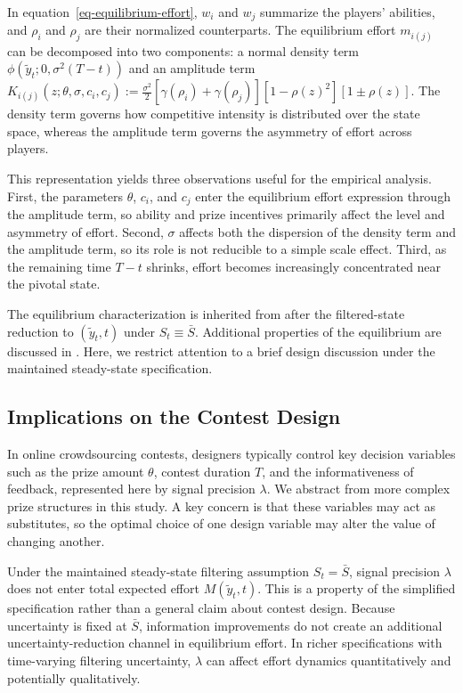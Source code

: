 \documentclass[mnsc]{informs3}
\begin{document}
In equation~\eqref{eq-equilibrium-effort}, $w_i$ and $w_j$ summarize the players' abilities, and $\rho_i$ and $\rho_j$ are their normalized counterparts.
The equilibrium effort $m_{i(j)}$ can be decomposed into two components: a normal density term $\phi(\tilde{y}_t; 0, \sigma^2(T-t))$ and an amplitude term $K_{i(j)}(z;\theta,\sigma,c_i,c_j)
:= \frac{\sigma^2}{2}\left[\gamma(\rho_i)+\gamma(\rho_j)\right]\left[1-\rho(z)^2\right]\left[1\pm\rho(z)\right]$.
The density term governs how competitive intensity is distributed over the state space, whereas the amplitude term governs the asymmetry of effort across players.

This representation yields three observations useful for the empirical analysis.
First, the parameters $\theta$, $c_i$, and $c_j$ enter the equilibrium effort expression through the amplitude term, so ability and prize incentives primarily affect the level and asymmetry of effort.
Second, $\sigma$ affects both the dispersion of the density term and the amplitude term, so its role is not reducible to a simple scale effect.
Third, as the remaining time $T-t$ shrinks, effort becomes increasingly concentrated near the pivotal state.

The equilibrium characterization is inherited from \citet{Ryvkin2022Fight} after the filtered-state reduction to $(\tilde y_t,t)$ under $S_t\equiv\bar S$.
Additional properties of the equilibrium are discussed in \citet{Ryvkin2022Fight}.
Here, we restrict attention to a brief design discussion under the maintained steady-state specification.



\subsection{Implications on the Contest Design}\label{sect-design}

In online crowdsourcing contests, designers typically control key decision variables such as the prize amount $\theta$, contest duration $T$, and the informativeness of feedback, represented here by signal precision $\lambda$.
We abstract from more complex prize structures in this study.
A key concern is that these variables may act as substitutes, so the optimal choice of one design variable may alter the value of changing another.

Under the maintained steady-state filtering assumption $S_t=\bar S$, signal precision $\lambda$ does not enter total expected effort $M(\tilde{y}_t,t)$.
This is a property of the simplified specification rather than a general claim about contest design.
Because uncertainty is fixed at $\bar S$, information improvements do not create an additional uncertainty-reduction channel in equilibrium effort.
In richer specifications with time-varying filtering uncertainty, $\lambda$ can affect effort dynamics quantitatively and potentially qualitatively.
\end{document}
